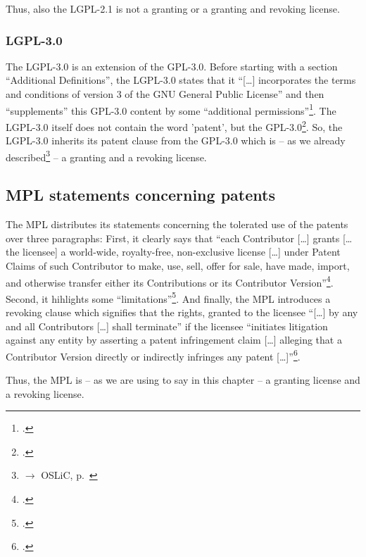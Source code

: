 Thus, also the LGPL-2.1 is not a granting or a granting and revoking license.

\subsubsection {LGPL-3.0}\label{subsec:Lgpl30PatentClause}

The LGPL-3.0 is an extension of the GPL-3.0. Before starting with a section
\enquote{Additional Definitions}, the LGPL-3.0 states that it \enquote{[\ldots]
incorporates the terms and conditions of version 3 of the GNU General Public
License} and then \enquote{supplements} this GPL-3.0 content by some
\enquote{additional permissions}\footcite[cf.][\nopage
wp]{Lgpl30OsiLicense2007a}. The LGPL-3.0 itself does not contain the word
'patent', but the GPL-3.0\footcite[cf.][\nopage wp.\ §11]{Gpl30OsiLicense2007a}.
So, the LGPL-3.0 inherits its patent clause from the GPL-3.0 which is -- as we
already described\footnote{$\rightarrow$ OSLiC, p.\
\pageref{subsec:Gpl30PatentClause}} -- a granting and a revoking license.
 
\subsection{MPL statements concerning patents}\label{subsec:MplPatentClause}

The MPL distributes its statements concerning the tolerated use of the patents
over three paragraphs: First, it clearly says that \enquote{each Contributor
[\ldots] grants [\ldots the licensee] a world-wide, royalty-free, non-exclusive
license [\ldots] under Patent Claims of such Contributor to make, use, sell,
offer for sale, have made, import, and otherwise transfer either its
Contributions or its Contributor Version}\footcite[cf.][\nopage wp.\ §2.1, esp.
§2.1.b]{Mpl20OsiLicense2013a}. Second, it hihlights some
\enquote{limitations}\footcite[cf.][\nopage wp.\ §2.1, esp.
§2.3]{Mpl20OsiLicense2013a}. And finally, the MPL introduces a revoking clause
which signifies that the rights, granted to the licensee \enquote{[\ldots] by
any and all Contributors [\ldots] shall terminate} if the licensee
\enquote{initiates litigation against any entity by asserting a patent
infringement claim [\ldots] alleging that a Contributor Version directly or
indirectly infringes any patent [\ldots]}\footcite[cf.][\nopage wp.\
§5.2]{Mpl20OsiLicense2013a}.

Thus, the MPL is -- as we are using to say in this chapter -- a granting license
and a revoking license.

